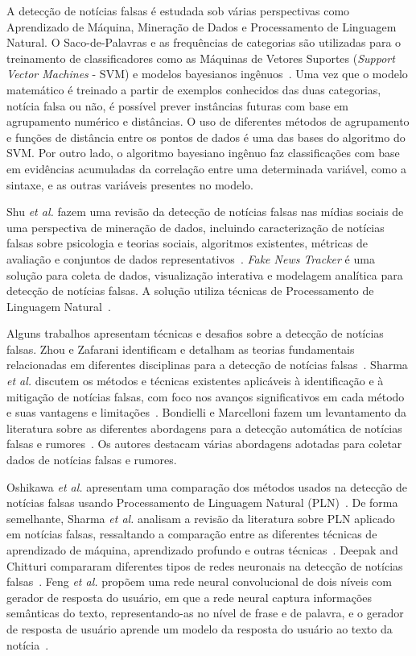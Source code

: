 \documentclass{SBCbookchapter}
\begin{document}
A detecção de notícias falsas é estudada sob várias perspectivas como Aprendizado de Máquina, Mineração de Dados e Processamento de Linguagem Natural. O Saco-de-Palavras e as frequências de categorias são utilizadas para  o treinamento de classificadores como as Máquinas de Vetores Suportes (\textit{Support Vector Machines } - SVM) e modelos bayesianos ingênuos~\cite{poddar2019comparison}. Uma vez que o modelo matemático é treinado a partir de exemplos conhecidos das duas categorias, notícia falsa ou não, é possível prever instâncias futuras com base em agrupamento numérico e distâncias. O uso de diferentes métodos de agrupamento e funções de distância entre os pontos de dados é uma das bases do algoritmo do SVM. Por outro lado, o algoritmo bayesiano ingênuo faz classificações com base em evidências acumuladas da correlação entre uma determinada variável, como a sintaxe, e as outras variáveis presentes no modelo.

Shu \textit{et al.} fazem uma revisão da detecção de notícias falsas nas mídias sociais de uma perspectiva de mineração de dados, incluindo caracterização de notícias falsas sobre psicologia e teorias sociais, algoritmos existentes, métricas de avaliação e conjuntos de dados representativos~\cite{shu2017fake}. \textit{Fake News Tracker} é uma solução para coleta de dados, visualização interativa e modelagem analítica para detecção de notícias falsas. A solução utiliza técnicas de Processamento de Linguagem Natural~\cite{shu2019fakenewstracker}. 

Alguns trabalhos apresentam técnicas e desafios sobre a detecção de notícias falsas. Zhou e Zafarani identificam e detalham as teorias fundamentais relacionadas em diferentes disciplinas para a detecção de notícias falsas~\cite{zhou2018fake}. Sharma \textit{et al.} discutem os métodos e técnicas existentes aplicáveis à identificação e à mitigação de notícias falsas, com foco nos avanços significativos em cada método e suas vantagens e limitações~\cite{sharma2019combating}. Bondielli e Marcelloni fazem um levantamento da literatura sobre as diferentes abordagens para a detecção automática de notícias falsas e rumores~\cite{BONDIELLI201938}. Os autores destacam várias abordagens adotadas para coletar dados de notícias falsas e rumores. 

Oshikawa \textit{et al.} apresentam uma comparação dos métodos usados na detecção de notícias falsas usando Processamento de Linguagem Natural (PLN)~\cite{oshikawa2018survey}. De forma semelhante, Sharma \textit{et al.} analisam a revisão da literatura sobre PLN aplicado em notícias falsas, ressaltando a comparação entre as diferentes técnicas de aprendizado de máquina, aprendizado profundo e outras técnicas~\cite{sharma2019combating}. Deepak and Chitturi compararam diferentes tipos de redes neuronais na detecção de notícias falsas~\cite{deepak-lstm}. Feng \textit{et al.} propõem uma rede neural convolucional de dois níveis com gerador de resposta do usuário, em que a rede neural captura informações semânticas do texto, representando-as no nível de frase e de palavra, e o gerador de resposta de usuário aprende um modelo da resposta do usuário ao texto da notícia~\cite{fengAndSharma}. 
\end{document}
